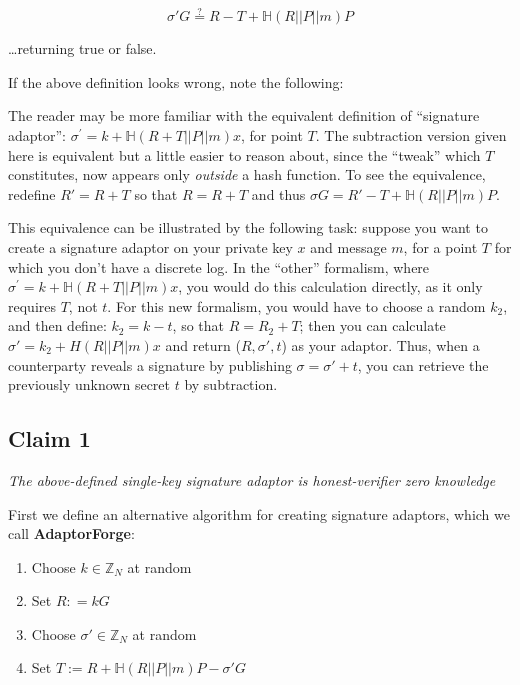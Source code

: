 \documentclass[10pt,a4paper]{article}
\begin{document}
$$ \sigma'G \stackrel{?}{=} R - T + \mathbb{H}(R||P||m)P$$

\ldots returning true or false.

\vspace{5 pt}

If the above definition looks wrong, note the following:

\vspace{5pt}

The reader may be more familiar with the equivalent definition of ``signature adaptor'': $\sigma^{'} = k + \mathbb{H}(R + T||P||m)x$, for point $T$. The subtraction version given here is equivalent but a little easier to reason about, since the ``tweak'' which $T$ constitutes, now appears only \emph{outside} a hash function. To see the equivalence, redefine $R' = R + T$ so that $R = R + T$ and thus $\sigma G = R' - T + \mathbb{H}(R||P||m)P$.

\vspace{5pt}

This equivalence can be illustrated by the following task: suppose you want to create a signature adaptor on your private key $x$ and message $m$, for a point $T$ for which you don't have a discrete log. In the ``other'' formalism, where $\sigma^{'} = k + \mathbb{H}(R + T||P||m)x$, you would do this calculation directly, as it only requires $T$, not $t$. For this new formalism, you would have to choose a random $k_2$, and then define: $k_2 = k - t$, so that $R = R_2 + T$; then you can calculate $\sigma' = k_2 + H(R||P||m)x$ and return ($R, \sigma', t$) as your adaptor. Thus, when a counterparty reveals a signature by publishing $\sigma = \sigma' + t$, you can retrieve the previously unknown secret $t$ by subtraction.

\subsection{Claim 1}

\emph{The above-defined single-key signature adaptor is honest-verifier zero knowledge}

\vspace{10 pt}

First we define an alternative algorithm for creating signature adaptors, which we call \textbf{AdaptorForge}:

\begin{enumerate}
\item Choose $k \in \mathbb{Z}_N$ at random
\item Set $R: = kG$
\item Choose $\sigma' \in \mathbb{Z}_N$ at random
\item Set $T := R + \mathbb{H}(R||P||m)P - \sigma' G$
\end{enumerate}
\end{document}
